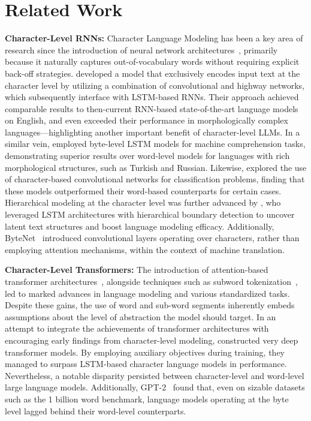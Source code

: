 \section{Related Work}
\label{section:related_work}

\textbf{Character-Level RNNs:} Character Language Modeling has been a key area of research since the introduction of neural network architectures~\citep{sutskever2011generating,mikolov2012subword,graves2013generating}, primarily because it naturally captures out-of-vocabulary words without requiring explicit back-off strategies. \cite{kim2016character} developed a model that exclusively encodes input text at the character level by utilizing a combination of convolutional and highway networks, which subsequently interface with LSTM-based RNNs. Their approach achieved comparable results to then-current RNN-based state-of-the-art language models on English, and even exceeded their performance in morphologically complex languages—highlighting another important benefit of character-level LLMs. In a similar vein, \cite{kenter2018byte} employed byte-level LSTM models for machine comprehension tasks, demonstrating superior results over word-level models for languages with rich morphological structures, such as Turkish and Russian. Likewise, \cite{zhang2015character} explored the use of character-based convolutional networks for classification problems, finding that these models outperformed their word-based counterparts for certain cases. Hierarchical modeling at the character level was further advanced by \citet{chung2019hierarchical}, who leveraged LSTM architectures with hierarchical boundary detection to uncover latent text structures and boost language modeling efficacy. Additionally, ByteNet~\citep{kalchbrenner2016neural} introduced convolutional layers operating over characters, rather than employing attention mechanisms, within the context of machine translation.

\textbf{Character-Level Transformers:} The introduction of attention-based transformer architectures~\citep{vaswani2017attention}, alongside techniques such as subword tokenization~\citep{sennrich-etal-2016-neural}, led to marked advances in language modeling and various standardized tasks. Despite these gains, the use of word and sub-word segments inherently embeds assumptions about the level of abstraction the model should target. In an attempt to integrate the achievements of transformer architectures with encouraging early findings from character-level modeling, \citet{al2019character} constructed very deep transformer models. By employing auxiliary objectives during training, they managed to surpass LSTM-based character language models in performance. Nevertheless, a notable disparity persisted between character-level and word-level large language models. Additionally, GPT-2~\citep{radfordgpt2} found that, even on sizable datasets such as the 1 billion word benchmark, language models operating at the byte level lagged behind their word-level counterparts.

